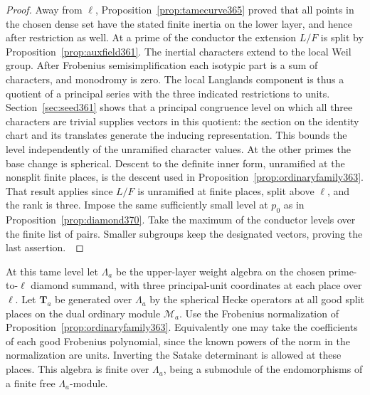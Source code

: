 \documentclass[a4paper,11pt]{article}
\theoremstyle{definition}
\theoremstyle{remark}
\numberwithin{equation}{section}
\begin{document}
\begin{proof}
Away from \(\ell\), Proposition~\ref{prop:tamecurve365}
proved that all points in the chosen dense set have the
stated finite inertia on the lower layer, and hence after
restriction as well. At a prime of the conductor the extension
\(L/F\) is split by Proposition~\ref{prop:auxfield361}.
The inertial characters extend to the local Weil group.
After Frobenius semisimplification each isotypic part is a sum
of characters, and monodromy is zero. The local Langlands
component is thus a quotient of a principal series with
the three indicated restrictions to units. Section~\ref{sec:seed361}
shows that a principal congruence level on which all three
characters are trivial supplies vectors in this quotient:
the section on the identity chart and its translates
generate the inducing representation. This bounds the level
independently of the unramified character values. At the
other primes the base change is spherical. Descent to the
definite inner form, unramified at the nonsplit finite places,
is the descent used in Proposition~\ref{prop:ordinaryfamily363}.
That result applies since \(L/F\) is unramified at finite
places, split above \(\ell\), and the rank is three.
Impose the same sufficiently small level at \(p_0\) as in
Proposition~\ref{prop:diamond370}. Take the maximum of the
conductor levels over the finite list of pairs. Smaller
subgroups keep the designated vectors, proving the last
assertion.~\cite{VII-V-geraghty363,VII-V-V-shin}
\end{proof}

At this tame level let \(\Lambda_a\) be the upper-layer weight
algebra on the chosen prime-to-\(\ell\) diamond summand, with
three principal-unit coordinates at each place over \(\ell\).
Let \(\mathbf T_a\) be generated over \(\Lambda_a\) by the
spherical Hecke operators at all good split places on the
dual ordinary module \(\mathcal M_a\). Use the Frobenius
normalization of Proposition~\ref{prop:ordinaryfamily363}.
Equivalently one may take the coefficients of each good
Frobenius polynomial, since the known powers of the norm in
the normalization are units. Inverting the Satake determinant
is allowed at these places. This algebra is finite over
\(\Lambda_a\), being a submodule of the endomorphisms of a
finite free \(\Lambda_a\)-module.
\end{document}
